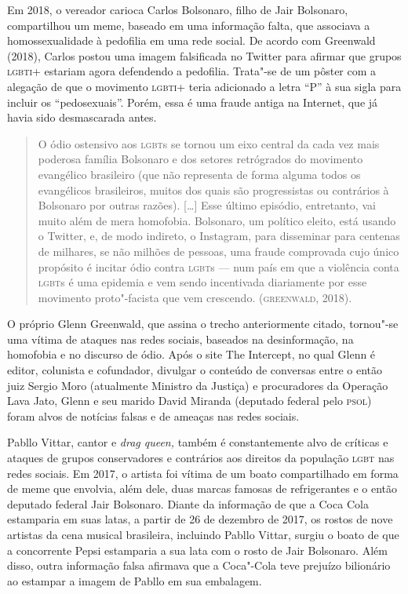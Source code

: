 Em 2018, o vereador carioca Carlos Bolsonaro, filho de Jair Bolsonaro,
compartilhou um meme, baseado em uma informação falta, que associava a
homossexualidade à pedofilia em uma rede social. De acordo com Greenwald
(2018), Carlos postou uma imagem falsificada no Twitter para afirmar que
grupos \textsc{lgbti}+ estariam agora defendendo a pedofilia. Trata"-se de um
pôster com a alegação de que o movimento \textsc{lgbti}+ teria adicionado a letra
``P'' à sua sigla para incluir os ``pedosexuais''. Porém, essa é uma
fraude antiga na Internet, que já havia sido desmascarada antes.

\begin{quote}
O ódio ostensivo aos \textsc{lgbt}s se tornou um eixo central da cada vez mais
poderosa família Bolsonaro e dos setores retrógrados do movimento
evangélico brasileiro (que não representa de forma alguma todos os
evangélicos brasileiros, muitos dos quais são progressistas ou
contrários à Bolsonaro por outras razões). {[}\ldots{}{]} Esse último
episódio, entretanto, vai muito além de mera homofobia. Bolsonaro, um
político eleito, está usando o Twitter, e, de modo indireto, o
Instagram, para disseminar para centenas de milhares, se não milhões de
pessoas, uma fraude comprovada cujo único propósito é incitar ódio
contra \textsc{lgbt}s --- num país em que a violência conta \textsc{lgbt}s é uma epidemia e
vem sendo incentivada diariamente por esse movimento proto"-facista que
vem crescendo. (\textsc{greenwald}, 2018).
\end{quote}

O próprio Glenn Greenwald, que assina o trecho anteriormente citado,
tornou"-se uma vítima de ataques nas redes sociais, baseados na
desinformação, na homofobia e no discurso de ódio. Após o site The
Intercept, no qual Glenn é editor, colunista e cofundador, divulgar o
conteúdo de conversas entre o então juiz Sergio Moro (atualmente
Ministro da Justiça) e procuradores da Operação Lava Jato, Glenn e seu
marido David Miranda (deputado federal pelo \textsc{psol}) foram alvos de
notícias falsas e de ameaças nas redes sociais.

Pabllo Vittar, cantor e \emph{drag queen,} também é constantemente alvo
de críticas e ataques de grupos conservadores e contrários aos direitos
da população \textsc{lgbt} nas redes sociais. Em 2017, o artista foi vítima de um
boato compartilhado em forma de meme que envolvia, além dele, duas
marcas famosas de refrigerantes e o então deputado federal Jair
Bolsonaro. Diante da informação de que a Coca Cola estamparia em suas
latas, a partir de 26 de dezembro de 2017, os rostos de nove artistas da
cena musical brasileira, incluindo Pabllo Vittar, surgiu o boato de que
a concorrente Pepsi estamparia a sua lata com o rosto de Jair Bolsonaro.
Além disso, outra informação falsa afirmava que a Coca"-Cola
teve prejuízo bilionário ao estampar a imagem de Pabllo em sua
embalagem.


